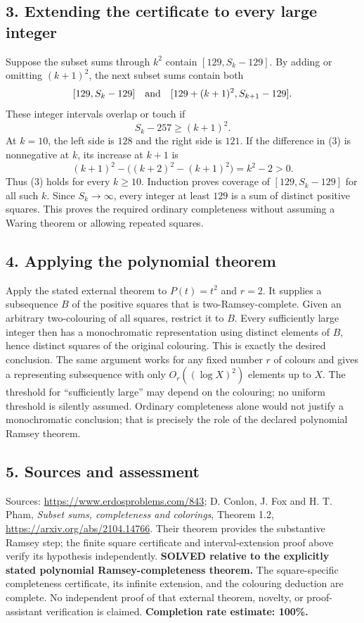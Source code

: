 \subsection*{3. Extending the certificate to every large integer}
Suppose the subset sums through $k^2$ contain $[129,S_k-129]$. By adding or omitting $(k+1)^2$, the next subset sums contain both
\[
 [129,S_k-129]\quad\hbox{and}\quad
 [129+(k+1)^2,S_{k+1}-129].
\]
These integer intervals overlap or touch if
\[
 S_k-257\ge(k+1)^2.                                     \tag{3}
\]
At $k=10$, the left side is $128$ and the right side is $121$. If the difference in (3) is nonnegative at $k$, its increase at $k+1$ is
\[
 (k+1)^2-\big((k+2)^2-(k+1)^2\big)=k^2-2>0.
\]
Thus (3) holds for every $k\ge10$. Induction proves coverage of $[129,S_k-129]$ for all such $k$. Since $S_k\to\infty$, every integer at least $129$ is a sum of distinct positive squares. This proves the required ordinary completeness without assuming a Waring theorem or allowing repeated squares.
\subsection*{4. Applying the polynomial theorem}
Apply the stated external theorem to $P(t)=t^2$ and $r=2$. It supplies a subsequence $B$ of the positive squares that is two-Ramsey-complete. Given an arbitrary two-colouring of all squares, restrict it to $B$. Every sufficiently large integer then has a monochromatic representation using distinct elements of $B$, hence distinct squares of the original colouring. This is exactly the desired conclusion.
The same argument works for any fixed number $r$ of colours and gives a representing subsequence with only $O_r((\log X)^2)$ elements up to $X$. The threshold for ``sufficiently large'' may depend on the colouring; no uniform threshold is silently assumed. Ordinary completeness alone would not justify a monochromatic conclusion; that is precisely the role of the declared polynomial Ramsey theorem.
\subsection*{5. Sources and assessment}
Sources: \url{https://www.erdosproblems.com/843}; D. Conlon, J. Fox and H. T. Pham, \emph{Subset sums, completeness and colorings}, Theorem 1.2, \url{https://arxiv.org/abs/2104.14766}. Their theorem provides the substantive Ramsey step; the finite square certificate and interval-extension proof above verify its hypothesis independently.
\textbf{SOLVED relative to the explicitly stated polynomial Ramsey-completeness theorem.} The square-specific completeness certificate, its infinite extension, and the colouring deduction are complete. No independent proof of that external theorem, novelty, or proof-assistant verification is claimed.
\textbf{Completion rate estimate: 100\%.}

